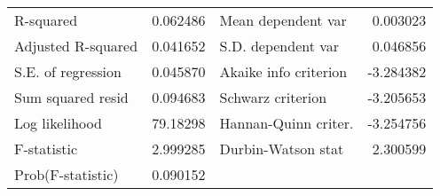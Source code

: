 \begin{tabular}{lrrrr}
\midrule
\multicolumn{1}{l}{R-squared}&\multicolumn{1}{r}{0.062486}&\multicolumn{2}{l}{Mean dependent var}&\multicolumn{1}{r}{0.003023}\\
\multicolumn{1}{l}{Adjusted R-squared}&\multicolumn{1}{r}{0.041652}&\multicolumn{2}{l}{S.D. dependent var}&\multicolumn{1}{r}{0.046856}\\
\multicolumn{1}{l}{S.E. of regression}&\multicolumn{1}{r}{0.045870}&\multicolumn{2}{l}{Akaike info criterion}&\multicolumn{1}{r}{-3.284382}\\
\multicolumn{1}{l}{Sum squared resid}&\multicolumn{1}{r}{0.094683}&\multicolumn{2}{l}{Schwarz criterion}&\multicolumn{1}{r}{-3.205653}\\
\multicolumn{1}{l}{Log likelihood}&\multicolumn{1}{r}{79.18298}&\multicolumn{2}{l}{Hannan-Quinn criter.}&\multicolumn{1}{r}{-3.254756}\\
\multicolumn{1}{l}{F-statistic}&\multicolumn{1}{r}{2.999285}&\multicolumn{2}{l}{Durbin-Watson stat}&\multicolumn{1}{r}{2.300599}\\
\multicolumn{1}{l}{Prob(F-statistic)}&\multicolumn{1}{r}{0.090152}&\multicolumn{1}{c}{}&\multicolumn{1}{c}{}&\multicolumn{1}{c}{}\\
\bottomrule
\end{tabular}
